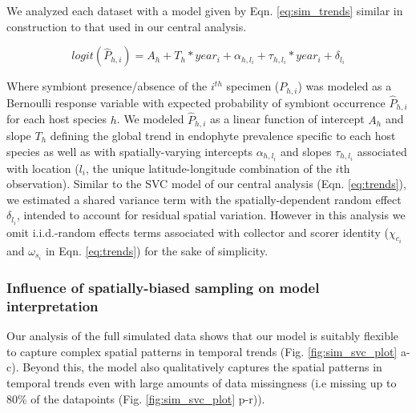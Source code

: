 \documentclass[11pt]{article}
\begin{document}
{We analyzed each dataset with a model given by Eqn. \ref{eq:sim_trends} similar in construction to that used in our central analysis. 

\begin{equation}
	\label{eq:sim_trends}
	logit(\hat{P}_{h,i}) = A_{h} + T_{h}*year_i  + \alpha_{h,l_{i}} + \tau_{h,l_i}*year_i + \delta_{l_i}
\end{equation}

Where symbiont presence/absence of the $i^{th}$ specimen ($P_{h,i}$) was modeled as a Bernoulli response variable with expected probability of symbiont occurrence $\hat{P}_{h,i}$ for each host species $h$.
We modeled $\hat{P}_{h,i}$ as a linear function of intercept $A_h$ and slope $T_{h}$ defining the global trend in endophyte prevalence specific to each host species as well as with spatially-varying intercepts $\alpha_{h,l_{i}} $ and slopes $\tau_{h,l_i}$ associated with location ($l_i$, the unique latitude-longitude combination of the $i$th observation).
Similar to the SVC model of our central analysis (Eqn. \ref{eq:trends}), we estimated a shared variance term with the spatially-dependent random effect $\delta_{l_i}$, intended to account for residual spatial variation. 
However in this analysis we omit i.i.d.-random effects terms associated with collector and scorer identity ($\chi_{c_i}$ and $\omega_{s_i}$ in Eqn. \ref{eq:trends}) for the sake of simplicity.

\subsubsection*{Influence of spatially-biased sampling on model interpretation}
Our analysis of the full simulated data shows that our model is suitably flexible to capture complex spatial patterns in temporal trends (Fig. \ref{fig:sim_svc_plot} a-c).
Beyond this,  the model also qualitatively captures the spatial patterns in temporal trends even with large amounts of data missingness (i.e missing up to $80$\% of the datapoints (Fig. \ref{fig:sim_svc_plot} p-r)). 


}
\end{document}
